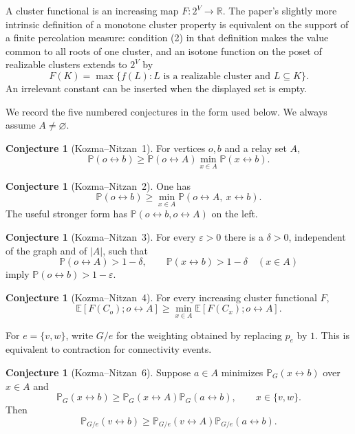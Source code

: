 \documentclass[11pt]{article}
\theoremstyle{definition}
\newtheorem{conjecture}[theorem]{Conjecture}
\theoremstyle{remark}
\newcommand{\PP}{\mathbb P}
\newcommand{\EE}{\mathbb E}
\newcommand{\con}{\leftrightarrow}
\newcommand{\KN}{Kozma--Nitzan}
\begin{document}
A cluster functional is an increasing map $F:2^V\to\mathbb R$.  The
paper's slightly more intrinsic definition of a monotone cluster property
is equivalent on the support of a finite percolation measure: condition
(2) in that definition makes the value common to all roots of one cluster,
and an isotone function on the poset of realizable clusters extends to
$2^V$ by
\[
 F(K)=\max\{f(L):L\text{ is a realizable cluster and }L\subseteq K\}.
\]
An irrelevant constant can be inserted when the displayed set is empty.

We record the five numbered conjectures in the form used below.  We always
assume $A\ne\varnothing$.

\begin{conjecture}[\KN\ 1]
For vertices $o,b$ and a relay set $A$,
\begin{equation}\label{eq:C1}
 \PP(o\con b)\geq \PP(o\con A)\min_{x\in A}\PP(x\con b).
\end{equation}
\end{conjecture}

\begin{conjecture}[\KN\ 2]
One has
\begin{equation}\label{eq:C2}
 \PP(o\con b)\geq
 \min_{x\in A}\PP(o\con A,\ x\con b).
\end{equation}
The useful stronger form has $\PP(o\con b,o\con A)$ on the left.
\end{conjecture}

\begin{conjecture}[\KN\ 3]
For every $\varepsilon>0$ there is a $\delta>0$, independent of the graph
and of $|A|$, such that
\[
 \PP(o\con A)>1-\delta,
 \qquad \PP(x\con b)>1-\delta\quad(x\in A)
\]
imply $\PP(o\con b)>1-\varepsilon$.
\end{conjecture}

\begin{conjecture}[\KN\ 4]
For every increasing cluster functional $F$,
\begin{equation}\label{eq:C4}
 \EE[F(C_o);o\con A]
 \geq \min_{x\in A}\EE[F(C_x);o\con A].
\end{equation}
\end{conjecture}

For $e=\{v,w\}$, write $G/e$ for the weighting obtained by replacing
$p_e$ by $1$.  This is equivalent to contraction for connectivity events.

\begin{conjecture}[\KN\ 6]
Suppose $a\in A$ minimizes $\PP_G(x\con b)$ over $x\in A$ and
\[
 \PP_G(x\con b)\geq
 \PP_G(x\con A)\PP_G(a\con b),\qquad x\in\{v,w\}.
\]
Then
\begin{equation}\label{eq:C6}
 \PP_{G/e}(v\con b)\geq
 \PP_{G/e}(v\con A)\PP_{G/e}(a\con b).
\end{equation}
\end{conjecture}
\end{document}
